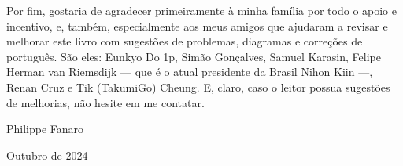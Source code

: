 Por fim, gostaria de agradecer primeiramente à minha família por todo o apoio e incentivo, e, também, especialmente aos meus amigos que ajudaram a revisar e melhorar este livro com sugestões de problemas, diagramas e correções de português. São eles: Eunkyo Do 1p, Simão Gonçalves, Samuel Karasin, Felipe Herman van Riemsdijk --- que é o atual presidente da Brasil Nihon Kiin ---, Renan Cruz e Tik (TakumiGo) Cheung. E, claro, caso o leitor possua sugestões de melhorias, não hesite em me contatar.

\bigskip
\smallskip
\smallskip
\smallskip

\hspace*{\fill} Philippe Fanaro \hspace{0.055cm}

\hspace*{\fill} Outubro de 2024 \hspace{0.05cm}

\clearedpage
\clearedpage